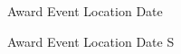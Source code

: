 



\begin{cvhonors}

  \cvhonor
    {Award} %
    {Event} %
    {Location} %
    {Date} %

\end{cvhonors}




\begin{cvhonors}

  \cvhonor
    {Award} %
    {Event} %
    {Location} %
    {Date} %
S
\end{cvhonors}
